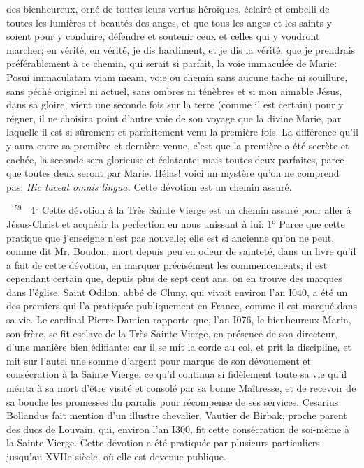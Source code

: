 \documentclass[paper=a5,pagesize=pdftex,fontsize=15pt,headinclude=on,twoside=off]{scrbook}
\newcommand{\negphantom}[1]{\settowidth{\dimen0}{#1}\hspace*{-\dimen0}}
\newcommand{\versenb}[1]{\par \vspace{10pt}~\negphantom{~${}^{#1}$~}${}^{#1}$~}
\newcommand{\latin}[1]{\emph{#1}}
\begin{document}
des bienheureux, orné de toutes leurs vertus héroïques, éclairé et embelli de toutes les lumières et beautés des
anges, et que tous les anges et les saints y soient pour y conduire, défendre et soutenir ceux et celles qui y
voudront marcher; en vérité, en vérité, je dis hardiment, et je dis la vérité, que je prendrais préférablement à ce
chemin, qui serait si parfait, la voie immaculée de Marie: Posui immaculatam viam meam, voie ou chemin sans
aucune tache ni souillure, sans péché originel ni actuel, sans ombres ni ténèbres et si mon aimable Jésus, dans sa
gloire, vient une seconde fois sur la terre (comme il est certain) pour y régner, il ne choisira point d'autre voie de
son voyage que la divine Marie, par laquelle il est si sûrement et parfaitement venu la première fois. La différence
qu'il y aura entre sa première et dernière venue, c'est que la première a été secrète et cachée, la seconde sera
glorieuse et éclatante; mais toutes deux parfaites, parce que toutes deux seront par Marie. Hélas! voici un mystère
qu'on ne comprend pas: \latin{Hic taceat omnis lingua.}
Cette dévotion est un chemin assuré.
\versenb{159} 4° Cette dévotion à la Très Sainte Vierge est un chemin assuré pour aller à Jésus-Christ et acquérir la
perfection en nous unissant à lui:
1° Parce que cette pratique que j'enseigne n'est pas nouvelle; elle est si ancienne qu'on ne peut, comme dit Mr.
Boudon, mort depuis peu en odeur de sainteté, dans un livre qu'il a fait de cette dévotion, en marquer précisément
les commencements; il est cependant certain que, depuis plus de sept cent ans, on en trouve des marques dans
l'église.
Saint Odilon, abbé de Cluny, qui vivait environ l'an I040, a été un des premiers qui l'a pratiquée publiquement en
France, comme il est marqué dans sa vie.
Le cardinal Pierre Damien rapporte que, l'an I076, le bienheureux Marin, son frère, se fit esclave de la Très Sainte
Vierge, en présence de son directeur, d'une manière bien édifiante: car il se mit la corde au col, et prit la discipline,
et mit sur l'autel une somme d'argent pour marque de son dévouement et consécration à la Sainte Vierge, ce qu'il
continua si fidèlement toute sa vie qu'il mérita à sa mort d'être visité et consolé par sa bonne Maîtresse, et de
recevoir de sa bouche les promesses du paradis pour récompense de ses services.
Cesarius Bollandus fait mention d'un illustre chevalier, Vautier de Birbak, proche parent des ducs de Louvain, qui,
environ l'an I300, fit cette consécration de soi-même à la Sainte Vierge. Cette dévotion a été pratiquée par
plusieurs particuliers jusqu'au XVIIe siècle, où elle est devenue publique.
\end{document}

